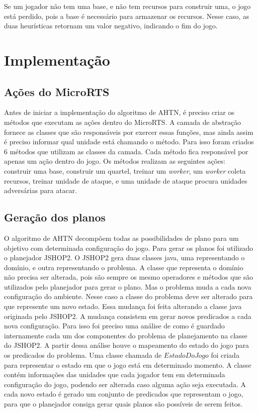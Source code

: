 Se um jogador não tem uma base, e não tem recursos para construir uma, o jogo está perdido, pois a base é necessário para armazenar os recursos. 
Nesse caso, as duas heurísticas retornam um valor negativo, indicando o fim do jogo. 

\section{Implementação}

\subsection{Ações do MicroRTS}

Antes de iniciar a implementação do algoritmo de AHTN, é preciso criar os métodos que executam as ações dentro do MicroRTS. 
A camada de abstração fornece as classes que são responsáveis por exercer essas funções, mas ainda assim é preciso informar qual unidade está chamando o método.
Para isso foram criados 6 métodos que utilizam as classes da camada.
Cada método fica responsável por apenas um ação dentro do jogo.
Os métodos realizam as seguintes ações: construir uma base, construir um quartel, treinar um \textit{worker}, um \textit{worker} coleta recursos, treinar unidade de ataque, e uma unidade de ataque procura unidades adversárias para atacar.

\subsection{Geração dos planos}

O algoritmo de AHTN decompõem todas as possibilidades de plano para um objetivo com determinada configuração do jogo.
Para gerar os planos foi utilizado o planejador JSHOP2.
O JSHOP2 gera duas classes java, uma representando o domínio, e outra representando o problema.
A classe que representa o domínio não precisa ser alterada, pois são sempre os mesmo operadores e métodos que são utilizados pelo planejador para gerar o plano.
Mas o problema muda a cada nova configuração do ambiente.
Nesse caso a classe do problema deve ser alterado para que represente um novo estado.
Essa mudança foi feita alterando a classe java originada pelo JSHOP2. 
A mudança consistem em gerar novos predicados a cada nova configuração.
Para isso foi preciso uma análise de como é guardado internamente cada um dos componentes do problema de planejamento na classe do JSHOP2.
A partir dessa análise houve o mapeamento do estado do jogo para os predicados do problema.
Uma classe chamada de $EstadoDoJogo$ foi criada para representar o estado em que o jogo está em determinado momento.
A classe contém informações das unidades que cada jogador tem em determinada configuração do jogo, podendo ser alterada caso alguma ação seja executada.
A cada novo estado é gerado um conjunto de predicados que representam o jogo, para que o planejador consiga gerar quais planos são possíveis de serem feitos.

